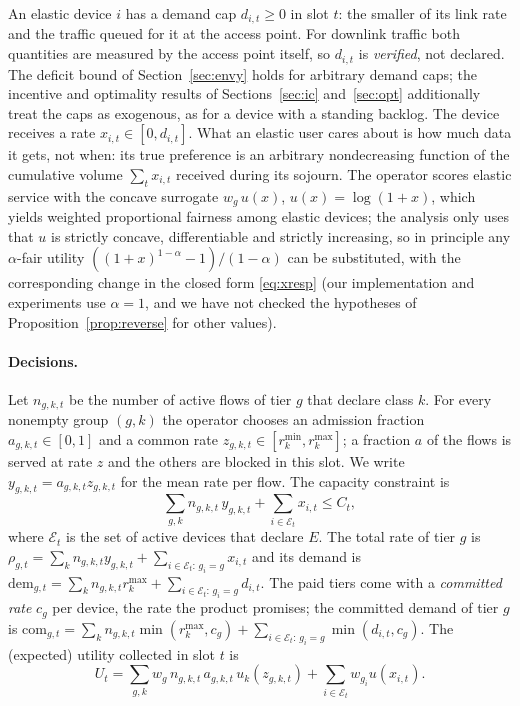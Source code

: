 \documentclass[preprint,11pt]{elsarticle}
\theoremstyle{definition}
\theoremstyle{remark}
\newcommand{\rmin}{r^{\min}}
\newcommand{\rmax}{r^{\max}}
\newcommand{\cE}{\mathcal{E}}
\newcommand{\dem}{\mathrm{dem}}
\begin{document}
An elastic device $i$ has a demand cap $d_{i,t}\ge 0$ in slot $t$: the smaller of its link rate and the traffic queued for it at the access point.
For downlink traffic both quantities are measured by the access point itself, so $d_{i,t}$ is \emph{verified}, not declared.
The deficit bound of Section~\ref{sec:envy} holds for arbitrary demand caps; the incentive and optimality results of Sections~\ref{sec:ic} and~\ref{sec:opt} additionally treat the caps as exogenous, as for a device with a standing backlog.
The device receives a rate $x_{i,t}\in[0,d_{i,t}]$.
What an elastic user cares about is how much data it gets, not when: its true preference is an arbitrary nondecreasing function of the cumulative volume $\sum_t x_{i,t}$ received during its sojourn.
The operator scores elastic service with the concave surrogate $w_g\,u(x)$, $u(x)=\log(1+x)$, which yields weighted proportional fairness among elastic devices; the analysis only uses that $u$ is strictly concave, differentiable and strictly increasing, so in principle any $\alpha$-fair utility $((1+x)^{1-\alpha}-1)/(1-\alpha)$ can be substituted, with the corresponding change in the closed form \eqref{eq:xresp} (our implementation and experiments use $\alpha=1$, and we have not checked the hypotheses of Proposition~\ref{prop:reverse} for other values).

\paragraph{Decisions.}
Let $n_{g,k,t}$ be the number of active flows of tier $g$ that declare class $k$.
For every nonempty group $(g,k)$ the operator chooses an admission fraction $a_{g,k,t}\in[0,1]$ and a common rate $z_{g,k,t}\in[\rmin_k,\rmax_k]$; a fraction $a$ of the flows is served at rate $z$ and the others are blocked in this slot.
We write $y_{g,k,t}=a_{g,k,t}z_{g,k,t}$ for the mean rate per flow.
The capacity constraint is
\begin{equation}\label{eq:cap}
\sum_{g,k} n_{g,k,t}\,y_{g,k,t}+\sum_{i\in\cE_t}x_{i,t}\le C_t ,
\end{equation}
where $\cE_t$ is the set of active devices that declare $E$.
The total rate of tier $g$ is $\rho_{g,t}=\sum_k n_{g,k,t}y_{g,k,t}+\sum_{i\in\cE_t:\,g_i=g}x_{i,t}$ and its demand is $\dem_{g,t}=\sum_k n_{g,k,t}\rmax_k+\sum_{i\in\cE_t:\,g_i=g}d_{i,t}$.
The paid tiers come with a \emph{committed rate} $c_g$ per device, the rate the product promises; the committed demand of tier $g$ is $\mathrm{com}_{g,t}=\sum_k n_{g,k,t}\min(\rmax_k,c_g)+\sum_{i\in\cE_t:\,g_i=g}\min(d_{i,t},c_g)$.
The (expected) utility collected in slot $t$ is
\begin{equation}\label{eq:util}
U_t=\sum_{g,k}w_g\,n_{g,k,t}\,a_{g,k,t}\,u_k(z_{g,k,t})+\sum_{i\in\cE_t}w_{g_i}u(x_{i,t}).
\end{equation}
\end{document}
